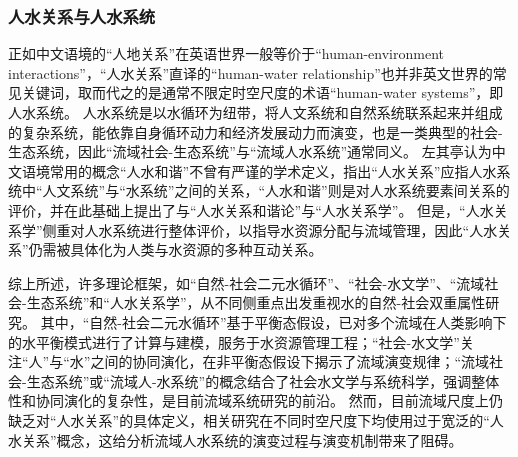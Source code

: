 \subsubsection*{人水关系与人水系统}

正如中文语境的“人地关系”在英语世界一般等价于“human-environment interactions”\cite{li2016c, liu2023}，“人水关系”直译的“human-water relationship”也并非英文世界的常见关键词，取而代之的是通常不限定时空尺度的术语“human-water systems”，即人水系统\cite{konar2019}。
人水系统是以水循环为纽带，将人文系统和自然系统联系起来并组成的复杂系统，能依靠自身循环动力和经济发展动力而演变\cite{zuo2007}，也是一类典型的社会-生态系统，因此“流域社会-生态系统”与“流域人水系统”通常同义\cite{yu2020}。
左其亭认为中文语境常用的概念“人水和谐”不曾有严谨的学术定义\cite{zuo2007}，指出“人水关系”应指人水系统中“人文系统”与“水系统”之间的关系，“人水和谐”则是对人水系统要素间关系的评价，并在此基础上提出了与“人水关系和谐论”与“人水关系学”\cite{zuoqiting2022, zuo2016a}。
但是，“人水关系学”侧重对人水系统进行整体评价，以指导水资源分配与流域管理，因此“人水关系”仍需被具体化为人类与水资源的多种互动关系\cite{zuo2016, zuo2020a}。

综上所述，许多理论框架，如“自然-社会二元水循环”、“社会-水文学”、“流域社会-生态系统”和“人水关系学”，从不同侧重点出发重视水的自然-社会双重属性研究。
其中，“自然-社会二元水循环”基于平衡态假设，已对多个流域在人类影响下的水平衡模式进行了计算与建模，服务于水资源管理工程；“社会-水文学”关注“人”与“水”之间的协同演化，在非平衡态假设下揭示了流域演变规律；“流域社会-生态系统”或“流域人-水系统”的概念结合了社会水文学与系统科学，强调整体性和协同演化的复杂性，是目前流域系统研究的前沿。
然而，目前流域尺度上仍缺乏对“人水关系”的具体定义，相关研究在不同时空尺度下均使用过于宽泛的“人水关系”概念，这给分析流域人水系统的演变过程与演变机制带来了阻碍。

